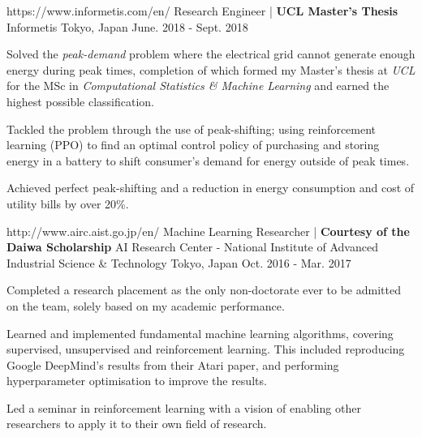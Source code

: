 \begin{cventries}
  \cventry
    {https://www.informetis.com/en/}
    {Research Engineer | \textbf{UCL Master's Thesis}} %
    {Informetis} %
    {Tokyo, Japan} %
    {June. 2018 - Sept. 2018} %
    {
      \begin{cvitems} %
        \item {Solved the \emph{peak-demand} problem where the electrical grid cannot generate enough energy during peak times, completion of which formed my Master's thesis at \emph{UCL} for the MSc in \emph{Computational Statistics \& Machine Learning} and earned the highest possible classification.}
        \item {Tackled the problem through the use of peak-shifting; using reinforcement learning (PPO) to find an optimal control policy of purchasing and storing energy in a battery to shift consumer's demand for energy outside of peak times.}
        \item {Achieved perfect peak-shifting and a reduction in energy consumption and cost of utility bills by over 20\%.}
      \end{cvitems}
    }

  \cventry
    {http://www.airc.aist.go.jp/en/}
    {Machine Learning Researcher | \textbf{Courtesy of the Daiwa Scholarship}} %
    {AI Research Center - National Institute of Advanced Industrial Science \& Technology} %
    {Tokyo, Japan} %
    {Oct. 2016 - Mar. 2017} %
    {
      \begin{cvitems} %
        \item {Completed a research placement as the only non-doctorate ever to be admitted on the team, solely based on my academic performance.}
        \item {Learned and implemented fundamental machine learning algorithms, covering supervised, unsupervised and reinforcement learning. This included reproducing Google DeepMind's results from their Atari paper, and performing hyperparameter optimisation to improve the results.}
        \item {Led a seminar in reinforcement learning with a vision of enabling other researchers to apply it to their own field of research.}
      \end{cvitems}
    }


\end{cventries}

